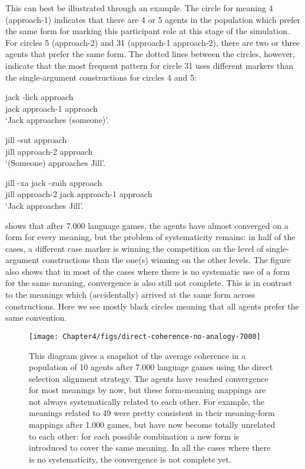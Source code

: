 This can best be illustrated through an example. The circle for meaning 4 (approach-1) indicates that there are 4  or 5 agents in the population which prefer the same form for marking this participant role at this stage of the simulation. For circles 5 (approach-2) and 31 (approach-1 approach-2), there are two or three agents that prefer the same form. The dotted lines between the circles, however, indicate that the most frequent pattern for circle 31 uses different markers than the single-argument constructions for circles 4 and 5:

\ea
\gll jack -lich approach\\
jack approach-1 approach\\
\glt `Jack approaches (someone)'.\\

\item
\gll jill -sut approach\\
jill approach-2 approach\\
\glt `(Someone) approaches Jill'.\\

\item
\gll jill -xa jack -zuih approach\\
jill approach-2 jack approach-1 approach\\
\glt `Jack approaches Jill'.\\
\z

\newpage
{} shows that after 7.000 language games, the agents have almost converged on a form for every meaning, but the problem of systematicity remains: in half of the cases, a different case marker is winning the competition on the level of single-argument constructions than the one(s) winning on the other levels. The figure also shows that in most of the cases where there is no systematic use of a form for the same meaning, convergence is also still not complete. This is in contrast to the meanings which (accidentally) arrived at the same form across constructions. Here we see mostly black circles meaning that all agents prefer the same convention.

\begin{figure}[p]
\centerline{\texttt{[image: Chapter4/figs/direct-coherence-no-analogy-7000]}}
  \caption[Experiment 1: snapshot after 7.000 games]{This diagram gives a snapshot of the average coherence in a population of 10 agents after 7.000 language games using the direct selection alignment strategy. The agents have reached convergence for most meanings by now, but these form-meaning mappings are not always systematically related to each other. For example, the meanings related to 49 were pretty consistent in their meaning-form mappings after 1.000 games, but have now become totally unrelated to each other: for each possible combination a new form is introduced to cover the same meaning. In all the cases where there is no systematicity, the convergence is not complete yet.}
   \label{f:1-coherence-7000}
\end{figure}


